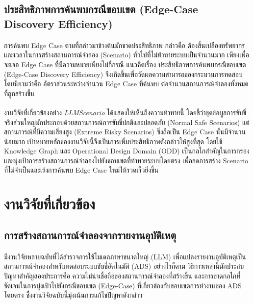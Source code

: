 \subsection{ประสิทธิภาพการค้นพบกรณีขอบเขต (Edge-Case Discovery Efficiency)}
\paragraph{}
การค้นพบ Edge Case ตามที่กล่าวมาข้างต้นมักขาดประสิทธิภาพ กล่าวคือ ต้องสิ้นเปลืองทรัพยากรและเวลาในการสร้างสถานการณ์จำลอง (Scenario) ทั่วไปที่ไม่ท้าทายระบบเป็นจำนวนมาก เพียงเพื่อจะเจอ Edge Case ที่มีความหมายเพียงไม่กี่กรณี แนวคิดเรื่อง ประสิทธิภาพการค้นพบกรณีขอบเขต (Edge-Case Discovery Efficiency) จึงเกิดขึ้นเพื่อวัดผลความสามารถของกระบวนการทดสอบ โดยนิยามว่าคือ อัตราส่วนระหว่างจำนวน Edge Case ที่ค้นพบ ต่อจำนวนสถานการณ์จำลองทั้งหมดที่ถูกสร้างขึ้น

\paragraph{}
งานวิจัยที่เกี่ยวข้องอย่าง \textit{LLMScenario} ได้แสดงให้เห็นถึงความท้าทายนี้ โดยชี้ว่าชุดข้อมูลการขับขี่จริงส่วนใหญ่มักประกอบด้วยสถานการณ์การขับขี่ปกติและปลอดภัย (Normal Safe Scenarios) แต่สถานการณ์ที่มีความเสี่ยงสูง (Extreme Risky Scenarios) ซึ่งถือเป็น Edge Case นั้นมีจำนวนน้อยมาก \cite{chang2023llmscenario} เป้าหมายหลักของงานวิจัยนี้จึงเป็นการเพิ่มประสิทธิภาพดังกล่าวให้สูงที่สุด โดยใช้ Knowledge Graph และ Operational Design Domain (ODD) เป็นกลไกสำคัญในการกรองและมุ่งเป้าการสร้างสถานการณ์จำลองไปยังขอบเขตที่ท้าทายระบบโดยตรง เพื่อลดการสร้าง Scenario ที่ไม่จำเป็นและเร่งการค้นพบ Edge Case ใหม่ให้รวดเร็วยิ่งขึ้น
\section{งานวิจัยที่เกี่ยวข้อง}

\subsection{การสร้างสถานการณ์จำลองจากรายงานอุบัติเหตุ}
\paragraph{}
มีงานวิจัยหลายฉบับที่ได้สำรวจการใช้โมเดลภาษาขนาดใหญ่ (LLM) เพื่อแปลงรายงานอุบัติเหตุเป็นสถานการณ์จำลองสำหรับทดสอบระบบขับขี่อัตโนมัติ (ADS) \cite{khot2024prompting} อย่างไรก็ตาม วิธีการเหล่านี้มักประสบปัญหาสำคัญสองประการคือ ความไม่น่าเชื่อถือของสถานการณ์จำลองที่สร้างขึ้น และการขาดกลไกที่ชัดเจนในการมุ่งเป้าไปยังกรณีขอบเขต (Edge-Case) ที่เกี่ยวข้องกับขอบเขตการทำงานของ ADS โดยตรง ซึ่งงานวิจัยฉบับนี้มุ่งเน้นการแก้ไขปัญหาดังกล่าว

